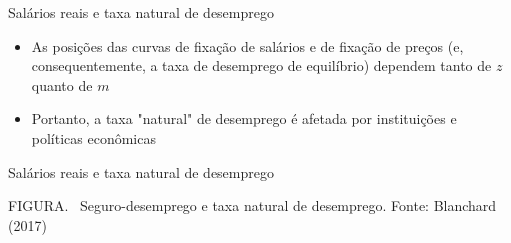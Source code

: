 \documentclass[10pt]{beamer}
\begin{document}
\begin{frame}
    {Salários reais e taxa natural de desemprego}
    \begin{itemize}
        \item As posições das curvas de fixação de salários e de fixação de preços (e, consequentemente, a taxa de desemprego de equilíbrio) dependem tanto de $z$ quanto de $m$\bigskip
        \item Portanto, a taxa "natural" de desemprego é afetada por instituições e políticas econômicas
    \end{itemize}
\end{frame}

\begin{frame}
    {Salários reais e taxa natural de desemprego}
    \begin{center}
		\begin{minipage}[b]{.5\textwidth}
			\tiny{{\scshape FIGURA}. \ Seguro-desemprego e taxa natural de desemprego. Fonte: Blanchard (2017)} 
		\end{minipage}
	\end{center}
\end{frame}
\end{document}
